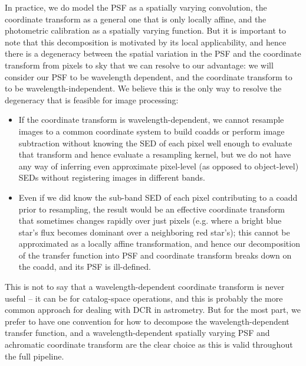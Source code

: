 \documentclass[DM,authoryear,toc]{lsstdoc}
\begin{document}
In practice, we do model the PSF as a spatially varying convolution, the coordinate transform as a general one that is only locally affine, and the photometric calibration as a spatially varying function.
But it is important to note that this decomposition is motivated by its local applicability, and hence there is a degeneracy between the spatial variation in the PSF and the coordinate transform from pixels to sky that we can resolve to our advantage: we will consider our PSF to be wavelength dependent, and the coordinate transform to to be wavelength-independent.
We believe this is the only way to resolve the degeneracy that is feasible for image processing:
\begin{itemize}
\item If the coordinate transform is wavelength-dependent, we cannot resample images to a common coordinate system to build coadds or perform image subtraction without knowing the SED of each pixel well enough to evaluate that transform and hence evaluate a resampling kernel, but we do not have any way of inferring even approximate pixel-level (as opposed to object-level) SEDs without registering images in different bands.
\item Even if we did know the sub-band SED of each pixel contributing to a coadd prior to resampling, the result would be an effective coordinate transform that sometimes changes rapidly over just pixels (e.g. where a bright blue star's flux becomes dominant over a neighboring red star's); this cannot be approximated as a locally affine transformation, and hence our decomposition of the transfer function into PSF and coordinate transform breaks down on the coadd, and its PSF is ill-defined.
\end{itemize}
This is not to say that a wavelength-dependent coordinate transform is never useful -- it can be for catalog-space operations, and this is probably the more common approach for dealing with DCR in astrometry.
But for the most part, we prefer to have one convention for how to decompose the wavelength-dependent transfer function, and a wavelength-dependent spatially varying PSF and achromatic coordinate transform are the clear choice as this is valid throughout the full pipeline.
\end{document}
